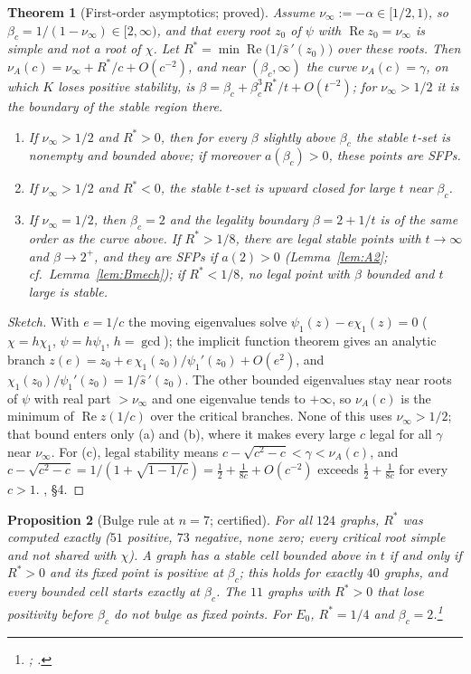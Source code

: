 \documentclass[11pt]{article}
\newtheorem{theorem}{Theorem}[section]
\newtheorem{proposition}[theorem]{Proposition}
\theoremstyle{definition}
\newcommand{\Rea}{\operatorname{Re}}
\begin{document}
\begin{theorem}[First-order asymptotics; proved]\label{thm:AS}
Assume $\nu_\infty:=-\alpha\in[1/2,1)$, so $\beta_c=1/(1-\nu_\infty)\in[2,\infty)$, and that every root $z_0$ of $\psi$ with
$\Rea z_0=\nu_\infty$ is simple and not a root of $\chi$. Let $R^*=\min\Rea\bigl(1/\hat s\,'(z_0)\bigr)$ over these roots. Then
$\nu_A(c)=\nu_\infty+R^*/c+O(c^{-2})$, and near $(\beta_c,\infty)$ the curve $\nu_A(c)=\gamma$, on which $K$ loses positive
stability, is $\beta=\beta_c+\beta_c^3R^*/t+O(t^{-2})$; for $\nu_\infty>1/2$ it is the boundary of the stable region there.
\begin{enumerate}
\item[(a)] If $\nu_\infty>1/2$ and $R^*>0$, then for every $\beta$ slightly above $\beta_c$ the stable $t$-set is nonempty and
bounded above; if moreover $a(\beta_c)>0$, these points are SFPs.
\item[(b)] If $\nu_\infty>1/2$ and $R^*<0$, the stable $t$-set is upward closed for large $t$ near $\beta_c$.
\item[(c)] If $\nu_\infty=1/2$, then $\beta_c=2$ and the legality boundary $\beta=2+1/t$ is of the same order as the curve
above. If $R^*>1/8$, there are legal stable points with $t\to\infty$ and $\beta\to2^+$, and they are SFPs if $a(2)>0$
(Lemma~\ref{lem:A2}; cf.\ Lemma~\ref{lem:Bmech}); if $R^*<1/8$, no legal point with $\beta$ bounded and $t$ large is stable.
\end{enumerate}
\end{theorem}
\begin{proof}[Sketch]
With $e=1/c$ the moving eigenvalues solve $\psi_1(z)-e\chi_1(z)=0$ ($\chi=h\chi_1$, $\psi=h\psi_1$, $h=\gcd$); the implicit function
theorem gives an analytic branch $z(e)=z_0+e\,\chi_1(z_0)/\psi_1'(z_0)+O(e^2)$, and $\chi_1(z_0)/\psi_1'(z_0)=1/\hat s\,'(z_0)$.
The other bounded eigenvalues stay near roots of $\psi$ with real part $>\nu_\infty$ and one eigenvalue tends to $+\infty$, so
$\nu_A(c)$ is the minimum of $\Rea z(1/c)$ over the critical branches. None of this uses $\nu_\infty>1/2$; that bound enters
only (a) and (b), where it makes every large $c$ legal for all $\gamma$ near $\nu_\infty$. For (c), legal stability means
$c-\sqrt{c^2-c}<\gamma<\nu_A(c)$, and $c-\sqrt{c^2-c}=1/(1+\sqrt{1-1/c})=\tfrac12+\tfrac1{8c}+O(c^{-2})$ exceeds
$\tfrac12+\tfrac1{8c}$ for every $c>1$. , \S4.
\end{proof}

\begin{proposition}[Bulge rule at $n=7$; certified]\label{prop:bulge}
For all $124$ graphs, $R^*$ was computed exactly ($51$ positive, $73$ negative, none zero; every critical root simple and not
shared with $\chi$). A graph has a stable cell bounded above in $t$ if and only if $R^*>0$ and its fixed point is positive at
$\beta_c$; this holds for exactly $40$ graphs, and every bounded cell starts exactly at $\beta_c$. The $11$ graphs with $R^*>0$
that lose positivity before $\beta_c$ do not bulge as fixed points. For $E_0$, $R^*=1/4$ and $\beta_c=2$.\footnote{; .}
\end{proposition}
\end{document}
